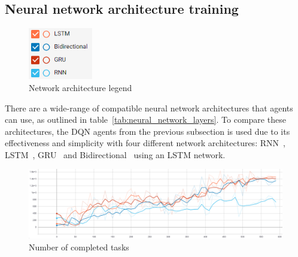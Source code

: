 

\subsection{Neural network architecture training}\label{subsec:neural-network-architecture-training}
\begin{figure}
    \includegraphics[width=0.25\textwidth]{figures/5_evaluation_figs/net_arch_training_fig/legend.png}
    \caption{Network architecture legend}
    \label{fig:net-arch-training-legend}
\end{figure}

There are a wide-range of compatible neural network architectures that agents can use, as outlined in
table~\ref{tab:neural_network_layers}. To compare these architectures, the DQN agents from the previous subsection is
used due to its effectiveness and simplicity with four different network architectures: RNN~\citep{RNN},
LSTM~\citep{LSTM}, GRU~\citep{GRU} and Bidirectional~\citep{Bidirectional} using an LSTM network. \\

\begin{figure}[H]
    \centering
    \includegraphics[width=\linewidth]{figures/5_evaluation_figs/net_arch_training_fig/num_completed_tasks.PNG}
    \caption{Number of completed tasks}
    \label{fig:net_arch_num_completed_tasks}
\end{figure}

